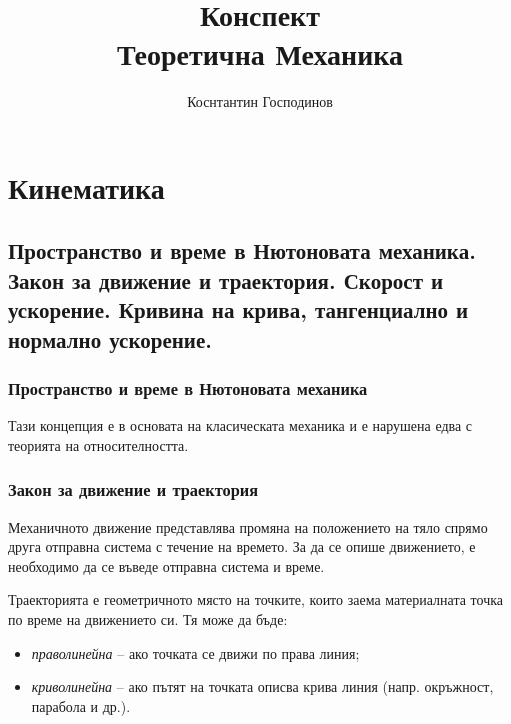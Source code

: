 \documentclass{report}
\title{\Huge{Конспект}\\Теоретична Механика}
\author{\huge{Коснтантин Господинов}}
\date{}
\begin{document}
\maketitle
\newpage%
\tableofcontents
\pagebreak

\chapter{Кинематика}
\section{Пространство и време в Нютоновата механика. Закон за движение и траектория. Скорост и ускорение. Кривина на крива, тангенциално и нормално ускорение.}
\medskip
\medskip

\subsection{Пространство и време в Нютоновата механика}


Тази концепция е в основата на класическата механика и е нарушена едва с теорията на относителността.
\subsection{Закон за движение и траектория}


Механичното движение представлява промяна на положението на тяло спрямо друга отправна система с течение на времето. За да се опише движението, е необходимо да се въведе отправна система и време.

Траекторията е геометричното място на точките, които заема материалната точка по време на движението си. Тя може да бъде:
\begin{itemize}
    \item \textit{праволинейна} – ако точката се движи по права линия;
    \item \textit{криволинейна} – ако пътят на точката описва крива линия (напр. окръжност, парабола и др.).
\end{itemize}
\end{document}
